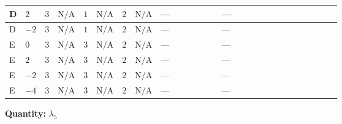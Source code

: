 \documentclass[8pt]{article}
\begin{document}
\begin{landscape}
\begin{longtable}{@{}llcccccc >{\raggedright\arraybackslash}p{0.21\linewidth} >{\raggedright\arraybackslash}p{0.21\linewidth} >{\raggedright\arraybackslash}p{0.21\linewidth}@{}}
\midrule
D & $2$ & $3$ & $\text{N/A}$ & $1$ & $\text{N/A}$ & $2$ & $\text{N/A}$ & --- & --- & \scriptsize\adjustbox{max width=\linewidth}{$\begin{gathered} -\frac{21 {g_2}^2 {\lambda_5}}{2}\end{gathered}$} \\
\midrule
D & $-2$ & $3$ & $\text{N/A}$ & $1$ & $\text{N/A}$ & $2$ & $\text{N/A}$ & --- & --- & \scriptsize\adjustbox{max width=\linewidth}{$\begin{gathered} -\frac{21 {g_2}^2 {\lambda_5}}{2}\end{gathered}$} \\
\midrule
E & $0$ & $3$ & $\text{N/A}$ & $3$ & $\text{N/A}$ & $2$ & $\text{N/A}$ & --- & --- & \scriptsize\adjustbox{max width=\linewidth}{$\begin{gathered} -\frac{33 {g_2}^2 {\lambda_5}}{2}\end{gathered}$} \\
\midrule
E & $2$ & $3$ & $\text{N/A}$ & $3$ & $\text{N/A}$ & $2$ & $\text{N/A}$ & --- & --- & \scriptsize\adjustbox{max width=\linewidth}{$\begin{gathered} -\frac{33 {g_2}^2 {\lambda_5}}{2}\end{gathered}$} \\
\midrule
E & $-2$ & $3$ & $\text{N/A}$ & $3$ & $\text{N/A}$ & $2$ & $\text{N/A}$ & --- & --- & \scriptsize\adjustbox{max width=\linewidth}{$\begin{gathered} -\frac{33 {g_2}^2 {\lambda_5}}{2}\end{gathered}$} \\
\midrule
E & $-4$ & $3$ & $\text{N/A}$ & $3$ & $\text{N/A}$ & $2$ & $\text{N/A}$ & --- & --- & \scriptsize\adjustbox{max width=\linewidth}{$\begin{gathered} -\frac{33 {g_2}^2 {\lambda_5}}{2}\end{gathered}$} \\
\midrule
\bottomrule
\end{longtable}
\clearpage
\noindent\textbf{Quantity: }$\lambda_5$\par\smallskip

\end{landscape}
\end{document}
